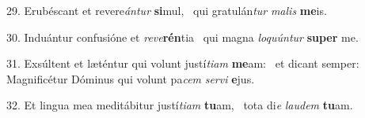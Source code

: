 29. Erubéscant et revere\textit{án}\textit{tur} \textbf{si}mul, \ast\  qui gratulán\textit{tur} \textit{ma}\textit{lis} \textbf{me}is.\

30. Induántur confusióne et \textit{re}\textit{ve}\textbf{rén}tia \ast\  qui magna \textit{lo}\textit{quún}\textit{tur} \textbf{su}\textbf{per} me.\

31. Exsúltent et læténtur qui volunt justí\textit{ti}\textit{am} \textbf{me}am: \ast\  et dicant semper: Magnificétur Dóminus qui volunt pa\textit{cem} \textit{ser}\textit{vi} \textbf{e}jus.\

32. Et lingua mea meditábitur justí\textit{ti}\textit{am} \textbf{tu}am, \ast\  tota di\textit{e} \textit{lau}\textit{dem} \textbf{tu}am.\

